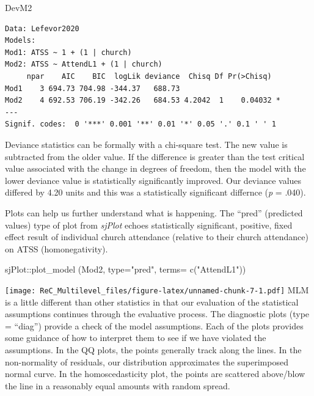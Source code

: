 \documentclass[
  english,
]{book}
\newenvironment{Shaded}{\begin{snugshade}}{\end{snugshade}}
\newcommand{\AttributeTok}[1]{\textcolor[rgb]{0.77,0.63,0.00}{#1}}
\newcommand{\FunctionTok}[1]{\textcolor[rgb]{0.00,0.00,0.00}{#1}}
\newcommand{\NormalTok}[1]{#1}
\newcommand{\SpecialCharTok}[1]{\textcolor[rgb]{0.00,0.00,0.00}{#1}}
\newcommand{\StringTok}[1]{\textcolor[rgb]{0.31,0.60,0.02}{#1}}
\begin{document}
\begin{Shaded}
\begin{Highlighting}[]
\NormalTok{DevM2}
\end{Highlighting}
\end{Shaded}

\begin{verbatim}
Data: Lefevor2020
Models:
Mod1: ATSS ~ 1 + (1 | church)
Mod2: ATSS ~ AttendL1 + (1 | church)
     npar    AIC    BIC  logLik deviance  Chisq Df Pr(>Chisq)  
Mod1    3 694.73 704.98 -344.37   688.73                       
Mod2    4 692.53 706.19 -342.26   684.53 4.2042  1    0.04032 *
---
Signif. codes:  0 '***' 0.001 '**' 0.01 '*' 0.05 '.' 0.1 ' ' 1
\end{verbatim}

Deviance statistics can be formally with a chi-square test. The new value is subtracted from the older value. If the difference is greater than the test critical value associated with the change in degrees of freedom, then the model with the lower deviance value is statistically significantly improved. Our deviance values differed by 4.20 units and this was a statistically significant differnce (\emph{p} = .040).

Plots can help us further understand what is happening. The ``pred'' (predicted values) type of plot from \emph{sjPlot} echoes statistically significant, positive, fixed effect result of individual church attendance (relative to their church attendance) on ATSS (homonegativity).

\begin{Shaded}
\begin{Highlighting}[]
\NormalTok{sjPlot}\SpecialCharTok{::}\FunctionTok{plot\_model}\NormalTok{ (Mod2, }\AttributeTok{type=}\StringTok{"pred"}\NormalTok{, }\AttributeTok{terms=} \FunctionTok{c}\NormalTok{(}\StringTok{"AttendL1"}\NormalTok{))}
\end{Highlighting}
\end{Shaded}

\texttt{[image: ReC\_Multilevel\_files/figure-latex/unnamed-chunk-7-1.pdf]}
MLM is a little different than other statistics in that our evaluation of the statistical assumptions continues through the evaluative process. The diagnostic plots (type = ``diag'') provide a check of the model assumptions. Each of the plots provides some guidance of how to interpret them to see if we have violated the assumptions. In the QQ plots, the points generally track along the lines. In the non-normality of residuals, our distribution approximates the superimposed normal curve. In the homoscedasticity plot, the points are scattered above/blow the line in a reasonably equal amounts with random spread.
\end{document}
